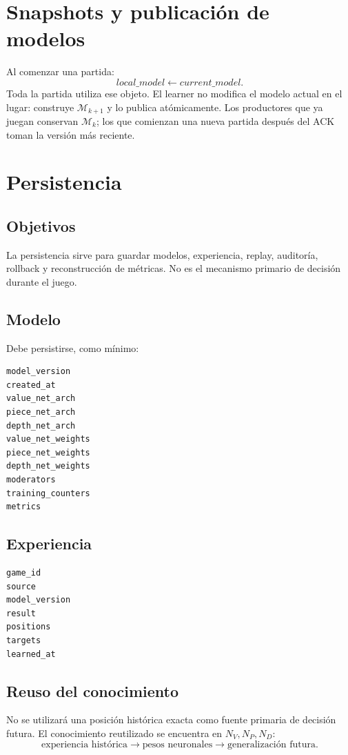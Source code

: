 \documentclass[11pt,a4paper]{article}
\newcommand{\Model}{\mathcal{M}}
\begin{document}
\section{Snapshots y publicación de modelos}
Al comenzar una partida:
\[
local\_model\leftarrow current\_model.
\]
Toda la partida utiliza ese objeto. El learner no modifica el modelo actual en el lugar: construye $\Model_{k+1}$ y lo publica atómicamente. Los productores que ya juegan conservan $\Model_k$; los que comienzan una nueva partida después del ACK toman la versión más reciente.

\section{Persistencia}
\subsection{Objetivos}
La persistencia sirve para guardar modelos, experiencia, replay, auditoría, rollback y reconstrucción de métricas. No es el mecanismo primario de decisión durante el juego.

\subsection{Modelo}
Debe persistirse, como mínimo:
\begin{lstlisting}
model_version
created_at
value_net_arch
piece_net_arch
depth_net_arch
value_net_weights
piece_net_weights
depth_net_weights
moderators
training_counters
metrics
\end{lstlisting}

\subsection{Experiencia}
\begin{lstlisting}
game_id
source
model_version
result
positions
targets
learned_at
\end{lstlisting}

\subsection{Reuso del conocimiento}
No se utilizará una posición histórica exacta como fuente primaria de decisión futura. El conocimiento reutilizado se encuentra en $N_V,N_P,N_D$:
\[
\boxed{\text{experiencia histórica}\rightarrow\text{pesos neuronales}\rightarrow\text{generalización futura}}.
\]
\end{document}
